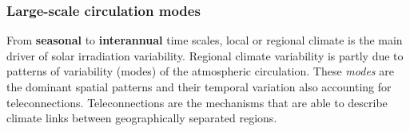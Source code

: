 
\subsubsection{Large-scale circulation modes}

From \textbf{seasonal} to \textbf{interannual} time scales, local or regional climate is the main driver of solar irradiation variability. Regional climate variability is partly due to patterns of variability (modes) of the atmospheric circulation. These \textit{modes} are the dominant spatial patterns and their temporal variation also accounting for teleconnections. Teleconnections are the mechanisms that are able to describe climate links between geographically separated regions. %



